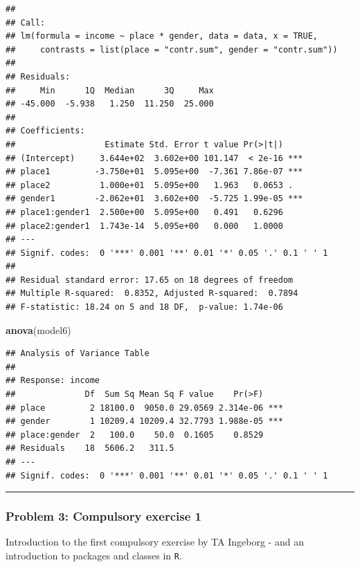 \documentclass[
]{article}
\newenvironment{Shaded}{\begin{snugshade}}{\end{snugshade}}
\newcommand{\FunctionTok}[1]{\textcolor[rgb]{0.13,0.29,0.53}{\textbf{#1}}}
\newcommand{\NormalTok}[1]{#1}
\begin{document}
\begin{verbatim}
## 
## Call:
## lm(formula = income ~ place * gender, data = data, x = TRUE, 
##     contrasts = list(place = "contr.sum", gender = "contr.sum"))
## 
## Residuals:
##     Min      1Q  Median      3Q     Max 
## -45.000  -5.938   1.250  11.250  25.000 
## 
## Coefficients:
##                  Estimate Std. Error t value Pr(>|t|)    
## (Intercept)     3.644e+02  3.602e+00 101.147  < 2e-16 ***
## place1         -3.750e+01  5.095e+00  -7.361 7.86e-07 ***
## place2          1.000e+01  5.095e+00   1.963   0.0653 .  
## gender1        -2.062e+01  3.602e+00  -5.725 1.99e-05 ***
## place1:gender1  2.500e+00  5.095e+00   0.491   0.6296    
## place2:gender1  1.743e-14  5.095e+00   0.000   1.0000    
## ---
## Signif. codes:  0 '***' 0.001 '**' 0.01 '*' 0.05 '.' 0.1 ' ' 1
## 
## Residual standard error: 17.65 on 18 degrees of freedom
## Multiple R-squared:  0.8352, Adjusted R-squared:  0.7894 
## F-statistic: 18.24 on 5 and 18 DF,  p-value: 1.74e-06
\end{verbatim}

\begin{Shaded}
\begin{Highlighting}[]
\FunctionTok{anova}\NormalTok{(model6)}
\end{Highlighting}
\end{Shaded}

\begin{verbatim}
## Analysis of Variance Table
## 
## Response: income
##              Df  Sum Sq Mean Sq F value    Pr(>F)    
## place         2 18100.0  9050.0 29.0569 2.314e-06 ***
## gender        1 10209.4 10209.4 32.7793 1.988e-05 ***
## place:gender  2   100.0    50.0  0.1605    0.8529    
## Residuals    18  5606.2   311.5                      
## ---
## Signif. codes:  0 '***' 0.001 '**' 0.01 '*' 0.05 '.' 0.1 ' ' 1
\end{verbatim}

\begin{center}\rule{0.5\linewidth}{0.5pt}\end{center}

\hypertarget{problem-3-compulsory-exercise-1}{%
\subsubsection{Problem 3: Compulsory exercise
1}\label{problem-3-compulsory-exercise-1}}

Introduction to the first compulsory exercise by TA Ingeborg - and an
introduction to packages and classes in \texttt{R}.
\end{document}
